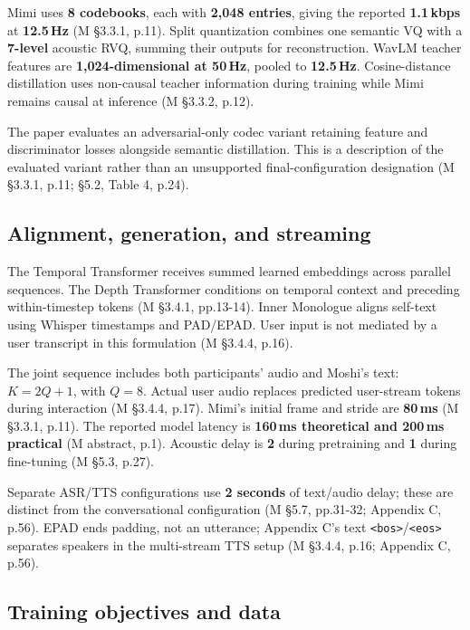 \documentclass[11pt]{article}
\begin{document}
Mimi uses \textbf{8 codebooks}, each with \textbf{2,048 entries}, giving the reported \textbf{1.1\,kbps} at \textbf{12.5\,Hz} (M §3.3.1, p.11). Split quantization combines one semantic VQ with a \textbf{7-level} acoustic RVQ, summing their outputs for reconstruction. WavLM teacher features are \textbf{1,024-dimensional at 50\,Hz}, pooled to \textbf{12.5\,Hz}. Cosine-distance distillation uses non-causal teacher information during training while Mimi remains causal at inference (M §3.3.2, p.12).

The paper evaluates an adversarial-only codec variant retaining feature and discriminator losses alongside semantic distillation. This is a description of the evaluated variant rather than an unsupported final-configuration designation (M §3.3.1, p.11; §5.2, Table 4, p.24).

\subsection*{Alignment, generation, and streaming}

The Temporal Transformer receives summed learned embeddings across parallel sequences. The Depth Transformer conditions on temporal context and preceding within-timestep tokens (M §3.4.1, pp.13-14). Inner Monologue aligns self-text using Whisper timestamps and PAD/EPAD. User input is not mediated by a user transcript in this formulation (M §3.4.4, p.16).

The joint sequence includes both participants' audio and Moshi's text: $K = 2Q + 1$, with $Q = 8$. Actual user audio replaces predicted user-stream tokens during interaction (M §3.4.4, p.17). Mimi's initial frame and stride are \textbf{80\,ms} (M §3.3.1, p.11). The reported model latency is \textbf{160\,ms theoretical and 200\,ms practical} (M abstract, p.1). Acoustic delay is \textbf{2} during pretraining and \textbf{1} during fine-tuning (M §5.3, p.27).

Separate ASR/TTS configurations use \textbf{2 seconds} of text/audio delay; these are distinct from the conversational configuration (M §5.7, pp.31-32; Appendix C, p.56). EPAD ends padding, not an utterance; Appendix C's text \texttt{<bos>}/\texttt{<eos>} separates speakers in the multi-stream TTS setup (M §3.4.4, p.16; Appendix C, p.56).

\subsection*{Training objectives and data}
\end{document}
